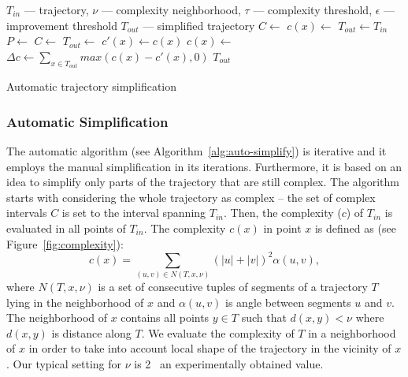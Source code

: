 \begin{algorithm}
  \begin{algorithmic}[1]
	  \Require $T_{in}$ --- trajectory, $\nu$ --- complexity neighborhood, $\tau$ --- complexity threshold, $\epsilon$ --- improvement threshold
	  \Ensure $T_{out}$ --- simplified trajectory
			\State $C \gets$  
			\State $c(x) \gets$ 
			\State
			\State $T_{out} \gets T_{in}$
			\Repeat
			  \State $P \gets$ 
				\State $C \gets$ 
			  \State
					\State $T_{out} \gets$ 
			  \EndFor
				\State
				\State $c'(x) \gets c(x)$ %
				\State $c(x) \gets$ 
				\State
				\State $\Delta c \gets \sum_{x \in T_{out}}{max(c(x) - c'(x), 0)}$
				\State {}
			\State
			\State \Return $T_{out}$
		\EndProcedure
  \end{algorithmic}
	\caption{Automatic trajectory simplification}
  \label{alg:auto-simplify}
\end{algorithm}

\subsubsection*{Automatic Simplification}

The automatic algorithm (see Algorithm~\ref{alg:auto-simplify}) is iterative and it employs the manual simplification in its iterations.
Furthermore, it is based on an idea to simplify only parts of the trajectory that are still complex.
The algorithm starts with considering the whole trajectory as complex -- the set of complex intervals $C$ is set to the interval spanning $T_{in}$.
Then, the complexity ($c$) of $T_{in}$ is evaluated in all points of $T_{in}$.
The complexity $c(x)$ in point $x$ is defined as (see Figure~\ref{fig:complexity}):
\begin{equation}
  c(x) = \sum_{(u, v) \in N(T, x, \nu)}{(|u| + |v|)^2 \alpha(u, v)}, %
\label{eq:complexity}
\end{equation}
where $N(T, x, \nu)$ is a set of consecutive tuples of segments of a trajectory $T$ lying in the neighborhood of $x$ and $\alpha(u, v)$ is angle between segments $u$ and $v$.
The neighborhood of $x$ contains all points $y \in T$ such that $d(x, y) < \nu$ where $d(x, y)$ is distance along $T$.
We evaluate the complexity of $T$ in a neighborhood of $x$ in order to take into account local shape of the trajectory in the vicinity of $x$.
Our typical setting for $\nu$ is 2 \angstrom\, an experimentally obtained value.

